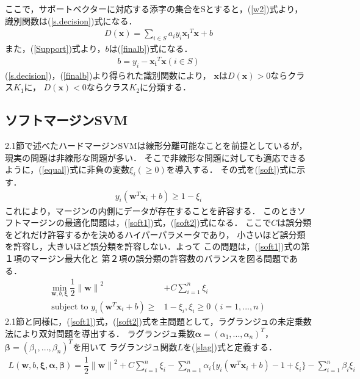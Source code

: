 ここで，サポートベクターに対応する添字の集合をSとすると，(\ref{w2})式より，
識別関数は(\ref{s.decision})式になる．
\begin{align}
    \label{s.decision}
    D(\boldsymbol{x}) = \sum_{i\in S}a_iy_i\boldsymbol{x_i}^T\boldsymbol{x} + b
\end{align}
また，(\ref{Support})式より，$b$は(\ref{finalb})式になる．
\begin{align}
  \label{finalb}
  b =y_i - \boldsymbol{x_i}^T\boldsymbol{x}(i \in S)
\end{align}
(\ref{s.decision})，(\ref{finalb})より得られた識別関数により，
$\boldsymbol{x}$は$D(\boldsymbol{x}) > 0$ならクラス$K_1$に，
$D(\boldsymbol{x}) < 0$ならクラス$K_2$に分類する．

\subsection{ソフトマージンSVM}
2.1節で述べたハードマージンSVMは線形分離可能なことを前提としているが，現実の問題は非線形な問題が多い．
そこで非線形な問題に対しても適応できるように，(\ref{equal})式に非負の変数$\xi_i(\geq 0)$を導入する．
その式を(\ref{soft})式に示す．
\begin{align}
    \label{soft}
    y_i(\boldsymbol{w}^T \boldsymbol{x}_i + b) \geq 1 - \xi_i
\end{align}
これにより，マージンの内側にデータが存在することを許容する．
このときソフトマージンの最適化問題は，(\ref{soft1})式，(\ref{soft2})式になる．
ここで$C$は誤分類をどれだけ許容するかを決めるハイパーパラメータであり，
小さいほど誤分類を許容し，大きいほど誤分類を許容しない．よって
この問題は，(\ref{soft1})式の第１項のマージン最大化と
第２項の誤分類の許容数のバランスを図る問題である．
\begin{subequations}
\begin{align}
    \underset{\boldsymbol{w},b,\boldsymbol{\xi}}{\text{min}}~\dfrac{1}{2}{\|\boldsymbol{{w}}\|}^2
    &+C\sum_{i=1}^{n}\xi_i \label{soft1}\\
   \text{subject to } y_i(\boldsymbol{w}^T \boldsymbol{x}_i + b) \geq &1 - \xi_i,\xi_i \geq 0 ~(i=1,...,n)\label{soft2}
\end{align}
\end{subequations}
2.1節と同様に，(\ref{soft1})式，(\ref{soft2})式を主問題として，ラグランジュの未定乗数法により双対問題を導出する．
ラグランジュ乗数$\boldsymbol{\alpha} = (\alpha_1,...,\alpha_n)^T$，
$\boldsymbol{\beta} = (\beta_1,...,\beta_n)^T$を用いて
ラグランジュ関数$L$を(\ref{slag})式と定義する．
\begin{align}
    \label{slag}
    L(\boldsymbol{w},b,\boldsymbol{\xi},\boldsymbol{\alpha},\boldsymbol{\beta}) 
    = \dfrac{1}{2}{\|\boldsymbol{{w}}\|}^2+C\sum_{i=1}^{n}\xi_i
    - \sum_{n = 1}^{n} \alpha_i \{y_i(\boldsymbol{w}^T \boldsymbol{x}_i + b)-1+\xi_i\}
    -\sum_{i=1}^{n}\beta_i\xi_i
\end{align}
